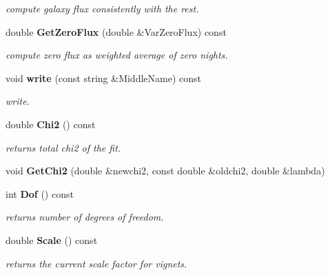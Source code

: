 \begin{CompactItemize}
\begin{CompactList}\small\item\em compute galaxy flux consistently with the rest.\item\end{CompactList}\item 
{}
double {\bf Get\-Zero\-Flux} (double \&Var\-Zero\-Flux) const\label{class_simultaneousfit_a16}

\begin{CompactList}\small\item\em compute zero flux as weighted average of zero nights.\item\end{CompactList}\item 
{}
void {\bf write} (const string \&Middle\-Name) const\label{class_simultaneousfit_a17}

\begin{CompactList}\small\item\em write.\item\end{CompactList}\item 
{}
double {\bf Chi2} () const\label{class_simultaneousfit_a18}

\begin{CompactList}\small\item\em returns total chi2 of the fit.\item\end{CompactList}\item 
{}
void {\bf Get\-Chi2} (double \&newchi2, const double \&oldchi2, double \&lambda)\label{class_simultaneousfit_a19}

\item 
{}
int {\bf Dof} () const\label{class_simultaneousfit_a20}

\begin{CompactList}\small\item\em returns number of degrees of freedom.\item\end{CompactList}\item 
{}
double {\bf Scale} () const\label{class_simultaneousfit_a21}

\begin{CompactList}\small\item\em returns the current scale factor for vignets.\item\end{CompactList}\end{CompactItemize}
